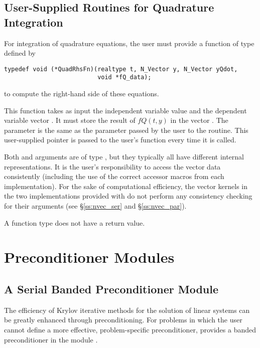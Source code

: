 \subsection{User-Supplied Routines for Quadrature Integration}

For integration of quadrature equations, the user must provide a function of
type  defined by
\begin{verbatim}
typedef void (*QuadRhsFn)(realtype t, N_Vector y, N_Vector yQdot, 
                          void *fQ_data);
\end{verbatim}
to compute the right-hand side of these equations.

This function takes as input the independent variable value 
and the dependent variable vector . It must store the
result of $fQ(t,y)$ in the vector . 
The  parameter is the same as the  parameter passed by 
the user to the  routine. This user-supplied pointer is passed to 
the user's  function every time it is called.

Both  and  arguments are of type ,
but they  typically all have different internal representations. It is the user's 
responsibility to access the vector data consistently (including the use of the 
correct accessor macros from each {\nvector} implementation). For the sake of 
computational efficiency, the vector kernels in the two {\nvector} implementations 
provided with {\cvodes} do not perform any consistency checking for their 
 arguments (see \S\ref{ss:nvec_ser} and \S\ref{ss:nvec_par}).

A  function type does not have a return value.


\section{{\cvodes} Preconditioner Modules}\label{ss:preconds}

\subsection{A Serial Banded Preconditioner Module}\label{sss:cvbandpre}

The efficiency of Krylov iterative methods for the solution of linear systems 
can be greatly enhanced through preconditioning. For problems in which the 
user cannot define a more effective, problem-specific preconditioner,
{\cvodes} provides a banded preconditioner in the module {\cvbandpre}.

